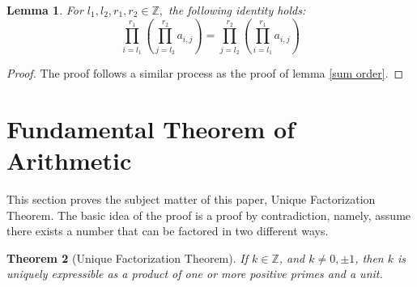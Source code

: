 \documentclass{article}
\newcommand{\Z}{\mathbb{Z}}
\newtheorem{thm}{Theorem}[section]
\newtheorem{lem}[thm]{Lemma}
\begin{document}
\begin{lem}
\label{product order}For $l_{1}, l_{2}, r_{1}, r_{2}\in \Z,$ the following identity holds:
\[\prod_{i=l_{1}}^{r_{1}}( \prod_{j=l_{2}}^{r_{2}} a_{i,j}) = \prod_{j=l_{2}}^{r_{2}} (\prod_{i=l_{1}}^{r_{1}} a_{i,j})\]

\end{lem}

\begin{proof}
The proof follows a similar process as the proof of lemma \ref{sum order}.
\end{proof}




\section{Fundamental Theorem of Arithmetic}
This section proves the subject matter of this paper, Unique Factorization Theorem. The basic idea of the proof is a proof by contradiction, namely, assume there exists a number that can be factored in two different ways. 
\begin{thm}[Unique Factorization Theorem]
\label{FTA}
If $k\in \Z$, and $k \neq 0, \pm 1$, then $k$ is uniquely expressible as a product of one or more positive primes and a unit. 
\end{thm}
\end{document}
